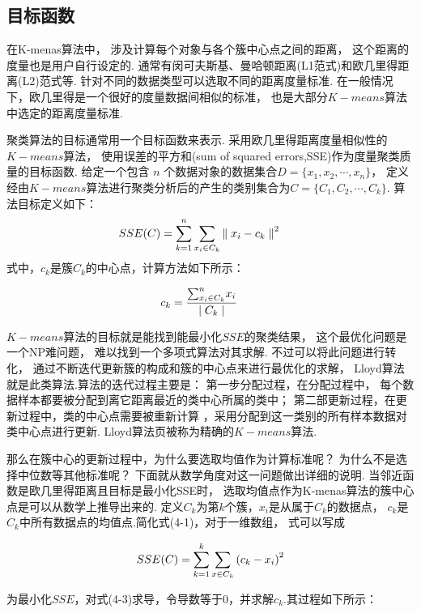 \documentclass[bachelor,adobefonts]{jnuthesis}
\begin{document}
\subsection{目标函数}
在K-menas算法中，
涉及计算每个对象与各个簇中心点之间的距离，
这个距离的度量也是用户自行设定的.
通常有闵可夫斯基、曼哈顿距离(L1范式)和欧几里得距离(L2)范式等.
针对不同的数据类型可以选取不同的距离度量标准.
在一般情况下，欧几里得是一个很好的度量数据间相似的标准，
也是大部分$K-means$算法中选定的距离度量标准.

聚类算法的目标通常用一个目标函数来表示.
采用欧几里得距离度量相似性的$K-means$算法，
使用误差的平方和(sum of squared errors,SSE)作为度量聚类质量的目标函数.
给定一个包含 $n$ 个数据对象的数据集合$D =\{ x_1, x_2, \cdots, x_n \}$，
定义经由$K-means$算法进行聚类分析后的产生的类别集合为$C=\{ C_1, C_2, \cdots, C_k \}$.
算法目标定义如下：
\begin{equation}
  \centering
  SSE(C) = \sum_{ k=1}^{n} \sum_{x_i \in C_k} {\parallel x_i - c_k \parallel}^2 \qquad 
\end{equation}
式中，$c_k$是簇$C_k$的中心点，计算方法如下所示：

\begin{equation}
  \centering
  c_k = \frac {{\sum_{x_i \in C_k}^{n}} x_i} {\mid C_k \mid} \qquad
\end{equation}

$K-means$算法的目标就是能找到能最小化$SSE$的聚类结果，
这个最优化问题是一个NP难问题，
难以找到一个多项式算法对其求解.
不过可以将此问题进行转化，
通过不断迭代更新簇的构成和簇的中心点来进行最优化的求解，
Lloyd算法就是此类算法.算法的迭代过程主要是：
第一步分配过程，在分配过程中，
每个数据样本都要被分配到离它距离最近的类中心所属的类中；
第二部更新过程，在更新过程中，类的中心点需要被重新计算
，采用分配到这一类别的所有样本数据对类中心点进行更新.
Lloyd算法页被称为精确的$K-means$算法.

那么在簇中心的更新过程中，为什么要选取均值作为计算标准呢？
为什么不是选择中位数等其他标准呢？
下面就从数学角度对这一问题做出详细的说明.
当邻近函数是欧几里得距离且目标是最小化SSE时，
选取均值点作为K-menas算法的簇中心点是可以从数学上推导出来的.
定义$C_k$为第$k$个簇，$x_i$是从属于$C_k$的数据点，
$c_k$是$C_k$中所有数据点的均值点.简化式(4-1)，对于一维数组，
式可以写成

\begin{equation}
  \centering
  SSE(C) = \sum_{k=1}^{k}\sum_{x \in C_k}\left(c_k-x_i\right)^2
\end{equation}

为最小化$SSE$，对式(4-3)求导，令导数等于0，并求解$c_k$.其过程如下所示：
\end{document}
